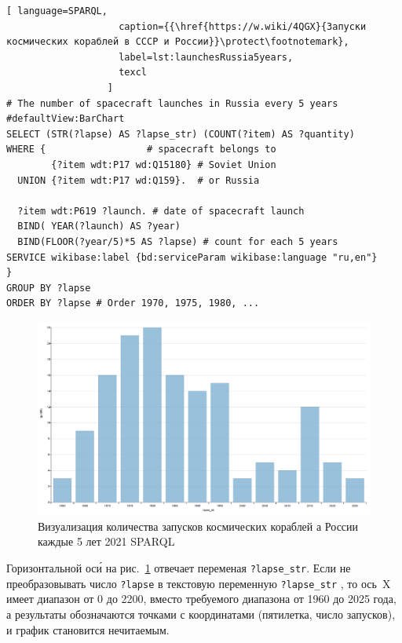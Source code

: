 \begin{lstlisting}[ language=SPARQL, 
                    caption={{\href{https://w.wiki/4QGX}{Запуски космических кораблей в СССР и России}}\protect\footnotemark}, 
                    label=lst:launchesRussia5years,
                    texcl
                  ]
# The number of spacecraft launches in Russia every 5 years
#defaultView:BarChart
SELECT (STR(?lapse) AS ?lapse_str) (COUNT(?item) AS ?quantity)
WHERE {                  # spacecraft belongs to
        {?item wdt:P17 wd:Q15180} # Soviet Union
  UNION {?item wdt:P17 wd:Q159}.  # or Russia
  
  ?item wdt:P619 ?launch. # date of spacecraft launch
  BIND( YEAR(?launch) AS ?year) 
  BIND(FLOOR(?year/5)*5 AS ?lapse) # count for each 5 years
SERVICE wikibase:label {bd:serviceParam wikibase:language "ru,en"}
} 
GROUP BY ?lapse
ORDER BY ?lapse # Order 1970, 1975, 1980, ...
\end{lstlisting}

\begin{figure}[h!]
  \includegraphics[width=\linewidth]{graphics/chapter/spacecraft_space_station/ImgRU.png}
  \caption[График Россия]{Визуализация количества запусков космических кораблей а России каждые 5 лет 2021 SPARQL}%
  \label{fig:launchesRussia5years}%
\end{figure}

Горизонтальной ос\'{и} на рис.~\ref{fig:launchesRussia5years} отвечает переменая \mbox{\lstinline|?lapse_str|.} 
Если не преобразовывать число \lstinline|?lapse| 
в текстовую переменную \mbox{\lstinline|?lapse_str|}%
, то ось~X имеет диапазон от 0 до 2200, 
вместо требуемого диапазона от 1960 до 2025 года, 
а результаты обозначаются точками с координатами (пятилетка, число запусков), 
и график становится нечитаемым. 

